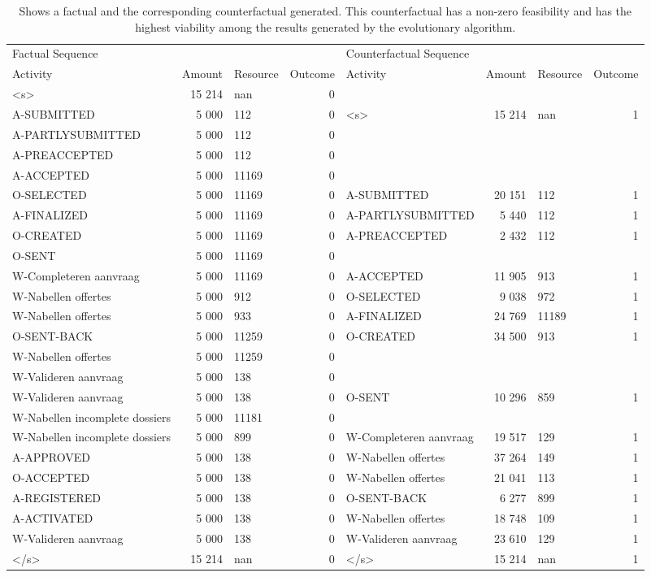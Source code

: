 \begin{table}
\caption{Shows a factual and the corresponding counterfactual generated. This counterfactual has a non-zero feasibility and has the highest viability among the results generated by the evolutionary algorithm.}
\label{tbl:example-cf-evo-feasibility}
\begin{tabular}{lrlrlrlr}
\toprule
\multicolumn{4}{l}{Factual Sequence} & \multicolumn{4}{l}{Counterfactual Sequence} \\
Activity & Amount & Resource & Outcome & Activity & Amount & Resource & Outcome \\
\midrule
<s> & 15 214 & nan & 0 &  &  &  &  \\
A-SUBMITTED & 5 000 & 112 & 0 & <s> & 15 214 & nan & 1 \\
A-PARTLYSUBMITTED & 5 000 & 112 & 0 &  &  &  &  \\
A-PREACCEPTED & 5 000 & 112 & 0 &  &  &  &  \\
A-ACCEPTED & 5 000 & 11169 & 0 &  &  &  &  \\
O-SELECTED & 5 000 & 11169 & 0 & A-SUBMITTED & 20 151 & 112 & 1 \\
A-FINALIZED & 5 000 & 11169 & 0 & A-PARTLYSUBMITTED & 5 440 & 112 & 1 \\
O-CREATED & 5 000 & 11169 & 0 & A-PREACCEPTED & 2 432 & 112 & 1 \\
O-SENT & 5 000 & 11169 & 0 &  &  &  &  \\
W-Completeren aanvraag & 5 000 & 11169 & 0 & A-ACCEPTED & 11 905 & 913 & 1 \\
W-Nabellen offertes & 5 000 & 912 & 0 & O-SELECTED & 9 038 & 972 & 1 \\
W-Nabellen offertes & 5 000 & 933 & 0 & A-FINALIZED & 24 769 & 11189 & 1 \\
O-SENT-BACK & 5 000 & 11259 & 0 & O-CREATED & 34 500 & 913 & 1 \\
W-Nabellen offertes & 5 000 & 11259 & 0 &  &  &  &  \\
W-Valideren aanvraag & 5 000 & 138 & 0 &  &  &  &  \\
W-Valideren aanvraag & 5 000 & 138 & 0 & O-SENT & 10 296 & 859 & 1 \\
W-Nabellen incomplete dossiers & 5 000 & 11181 & 0 &  &  &  &  \\
W-Nabellen incomplete dossiers & 5 000 & 899 & 0 & W-Completeren aanvraag & 19 517 & 129 & 1 \\
A-APPROVED & 5 000 & 138 & 0 & W-Nabellen offertes & 37 264 & 149 & 1 \\
O-ACCEPTED & 5 000 & 138 & 0 & W-Nabellen offertes & 21 041 & 113 & 1 \\
A-REGISTERED & 5 000 & 138 & 0 & O-SENT-BACK & 6 277 & 899 & 1 \\
A-ACTIVATED & 5 000 & 138 & 0 & W-Nabellen offertes & 18 748 & 109 & 1 \\
W-Valideren aanvraag & 5 000 & 138 & 0 & W-Valideren aanvraag & 23 610 & 129 & 1 \\
</s> & 15 214 & nan & 0 & </s> & 15 214 & nan & 1 \\
\bottomrule
\end{tabular}
\end{table}
